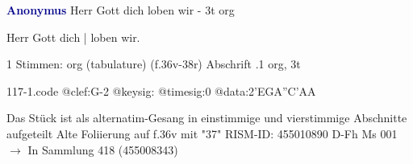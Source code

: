 \documentclass[twocolumn]{book}
\begin{document}
\newline \par \vspace{7pt} \textcolor{darkblue}{\textbf{Anonymus  }}
\newline Herr Gott dich loben wir - 3t
\newline org
\newline \begin{itshape}[f.36v, at left:] Herr Gott dich | loben wir.\end{itshape} 
\newline \textcolor{darkblue}{}  1 Stimmen: org (tabulature)  (f.36v-38r)
\newline Abschrift
.1  org, 3t  
\begin{filecontents*}{117-1.code}
@clef:G-2
@keysig:
@timesig:0
@data:2'EGA''C'AA
\end{filecontents*}
\newline
%
\newline Das Stück ist als alternatim-Gesang in einstimmige und vierstimmige Abschnitte aufgeteilt
\newline Alte Foliierung auf f.36v mit "37"
\newline RISM-ID: 455010890
\newline D-Fh  Ms 001
\newline $\rightarrow$ In Sammlung 418 (455008343)
      
\end{document}
